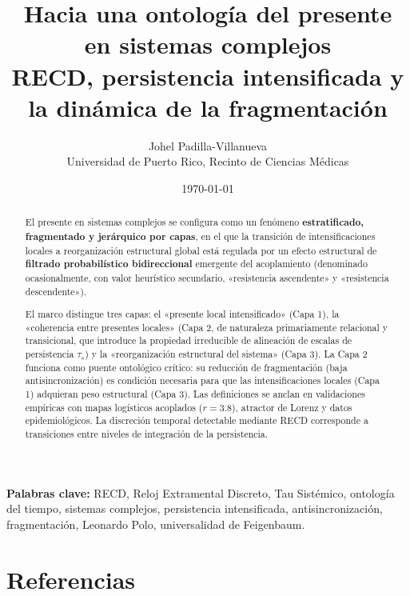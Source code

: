 \documentclass[11pt,a4paper]{article}
\title{\textbf{Hacia una ontología del presente en sistemas complejos}\\[0.3em]
\large RECD, persistencia intensificada y la dinámica de la fragmentación}
\author{Johel Padilla-Villanueva\\
\small Universidad de Puerto Rico, Recinto de Ciencias Médicas}
\date{\today}
\begin{document}
\maketitle

\begin{abstract}
El presente en sistemas complejos se configura como un fenómeno \textbf{estratificado, fragmentado y jerárquico por capas}, en el que la transición de intensificaciones locales a reorganización estructural global está regulada por un efecto estructural de \textbf{filtrado probabilístico bidireccional} emergente del acoplamiento (denominado ocasionalmente, con valor heurístico secundario, «resistencia ascendente» y «resistencia descendente»).

El marco distingue tres capas: el «presente local intensificado» (Capa 1), la «coherencia entre presentes locales» (Capa 2, de naturaleza primariamente relacional y transicional, que introduce la propiedad irreducible de alineación de escalas de persistencia $\tau_s$) y la «reorganización estructural del sistema» (Capa 3). La Capa 2 funciona como puente ontológico crítico: su reducción de fragmentación (baja antisincronización) es condición necesaria para que las intensificaciones locales (Capa 1) adquieran peso estructural (Capa 3). Las definiciones se anclan en validaciones empíricas con mapas logísticos acoplados ($r=3.8$), atractor de Lorenz y datos epidemiológicos. La discreción temporal detectable mediante RECD corresponde a transiciones entre niveles de integración de la persistencia.
\end{abstract}

\noindent\textbf{Palabras clave:} RECD, Reloj Extramental Discreto, Tau Sistémico, ontología del tiempo, sistemas complejos, persistencia intensificada, antisincronización, fragmentación, Leonardo Polo, universalidad de Feigenbaum.

\newpage
\tableofcontents
\newpage










\section*{Referencias}

\sloppy

\normalfont
\end{document}
